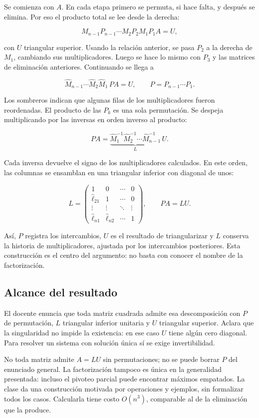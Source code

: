 \documentclass[12pt,a4paper]{article}
\begin{document}
Se comienza con $A$. En cada etapa primero se permuta, si hace falta, y después se elimina. Por eso el producto total se lee desde la derecha:

\[
M_{n-1}P_{n-1}\cdots M_2P_2M_1P_1A=U,
\]

con $U$ triangular superior. Usando la relación anterior, se pasa $P_2$ a la derecha de $M_1$, cambiando sus multiplicadores. Luego se hace lo mismo con $P_3$ y las matrices de eliminación anteriores. Continuando se llega a

\[
\widehat M_{n-1}\cdots\widehat M_2\widehat M_1\,PA=U,
\qquad P=P_{n-1}\cdots P_1.
\]

Los sombreros indican que algunas filas de los multiplicadores fueron reordenadas. El producto de las $P_k$ es una sola permutación. Se despeja multiplicando por las inversas en orden inverso al producto:

\[
PA=\underbrace{\widehat M_1^{-1}\widehat M_2^{-1}\cdots
\widehat M_{n-1}^{-1}}_{L}\,U.
\]

Cada inversa devuelve el signo de los multiplicadores calculados. En este orden, las columnas se ensamblan en una triangular inferior con diagonal de unos:

\[
L=\begin{pmatrix}
1&0&\cdots&0\\
\widehat\ell_{21}&1&\cdots&0\\
\vdots&\vdots&\ddots&\vdots\\
\widehat\ell_{n1}&\widehat\ell_{n2}&\cdots&1
\end{pmatrix},\qquad \boxed{PA=LU}.
\]

Así, $P$ registra los intercambios, $U$ es el resultado de triangularizar y $L$ conserva la historia de multiplicadores, ajustada por los intercambios posteriores. Esta construcción es el centro del argumento: no basta con conocer el nombre de la factorización.

\subsection{Alcance del resultado}

El docente enuncia que toda matriz cuadrada admite esa descomposición con $P$ de permutación, $L$ triangular inferior unitaria y $U$ triangular superior. Aclara que la singularidad no impide la existencia: en ese caso $U$ tiene algún cero diagonal. Para resolver un sistema con solución única sí se exige invertibilidad.

No toda matriz admite $A=LU$ sin permutaciones; no se puede borrar $P$ del enunciado general. La factorización tampoco es única en la generalidad presentada: incluso el pivoteo parcial puede encontrar máximos empatados. La clase da una construcción motivada por operaciones y ejemplos, sin formalizar todos los casos. Calcularla tiene costo $O(n^3)$, comparable al de la eliminación que la produce.
\end{document}

